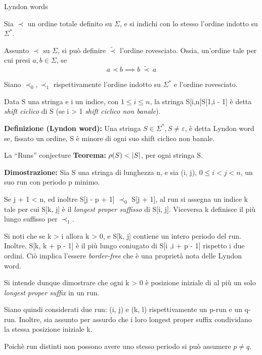 \documentclass{beamer}
\begin{document}
    \begin{frame}{Lyndon words}

        Sia \(\prec\) un ordine totale definito su \(\Sigma\),
        e si indichi con lo stesso l'ordine indotto su \(\Sigma^{*}\).
        
        Assunto \(\prec \text{ su } \Sigma\), si può definire \(\tilde{\prec}\)
        l'ordine rovesciato. Ossia, un'ordine tale per cui presi \(a, b \in \Sigma\),
        se 
        \[
            a \prec b \implies b \ \tilde{\prec} \ a
        \]

        Siano \(\prec_{0}, \prec_{1}\) rispettivamente l'ordine indotto su 
        \(\Sigma^{*}\) e l'ordine rovesciato.

    \end{frame}
    \begin{frame}
        Data S una stringa e i un indice, con \(1 \le i \le n\),
        la stringa S[i,n]S[1,i - 1] è detta \emph{shift ciclico} di S 
        (se i > 1 \emph{shift ciclico non banale}).

        \textbf{Definizione (Lyndon word): } 
        Una stringa \(S \in \Sigma^{*}, S \ne \varepsilon\),
        è detta Lyndon word se, fissato un ordine,
        S è minore di ogni suo shift ciclico non banale.
    \end{frame}
    \begin{frame}{La ``Runs'' conjecture}
        \textbf{Teorema: } \(\rho(S) < \left\lvert S \right\rvert\), per ogni stringa S.

        \textbf{Dimostrazione: } Sia S una stringa di lunghezza n,
        e sia (i, j), \(0 \le i < j < n\), un suo run con periodo p minimo.

        Se j + 1 < n, ed inoltre S[j - p + 1] \(\prec_{0}\) S[j + 1],
        al run si assegna un indice k tale per cui S[k, j] è il \emph{longest proper suffisso}
        di S[i, j]. Viceversa k definisce il più lungo suffisso per \(\prec_{1}\).

        Si noti che se k > i allora k > 0, e S[k, j] contiene un intero periodo del run.
        Inoltre, S[k, k + p - 1] è il più lungo coniugato di S[i ,i + p - 1]
        rispetto i due ordini. Ciò implica l'essere \emph{border-free} %
        che è una proprietà nota delle Lyndon word.
    \end{frame}
    \begin{frame}
        Si intende dunque dimostrare che ogni k > 0 è posizione iniziale 
        di al più un solo \emph{longest proper suffix} in un run.

        Siano quindi considerati due run: (i, j) e (k, l) rispettivamente
        un p-run e un q-run. Inoltre, sia assunto per assurdo che 
        i loro longest proper suffix condividano la stessa posizione iniziale k.

        Poichè run distinti non possono avere uno stesso periodo si può assumere
        \(p \ne q\).
    \end{frame}
\end{document}
